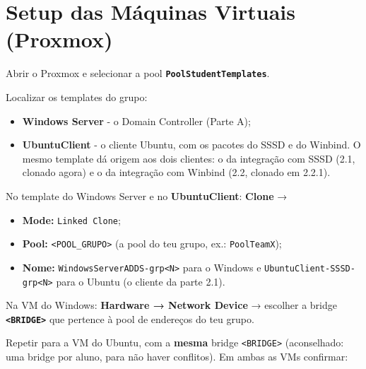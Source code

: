 
\section*{Setup das Máquinas Virtuais (Proxmox)}


Abrir o Proxmox e selecionar a pool \textbf{\texttt{PoolStudentTemplates}}.


Localizar os templates do grupo:

\begin{itemize}
\item \textbf{Windows Server} - o Domain Controller (Parte A);
\item \textbf{UbuntuClient} - o cliente Ubuntu, com os pacotes do SSSD e do Winbind. O mesmo template dá origem aos dois clientes: o da integração com SSSD (2.1, clonado agora) e o da integração com Winbind (2.2, clonado em 2.2.1).
\end{itemize}


No template do Windows Server e no \textbf{UbuntuClient}: \textbf{Clone} →

\begin{itemize}
\item \textbf{Mode:} \texttt{Linked Clone};
\item \textbf{Pool:} \texttt{\textless{}POOL\_GRUPO\textgreater{}} (a pool do teu grupo, ex.: \texttt{PoolTeamX});
\item \textbf{Nome:} \texttt{WindowsServerADDS-grp\textless{}N\textgreater{}} para o Windows e \texttt{UbuntuClient-SSSD-grp\textless{}N\textgreater{}} para o Ubuntu (o cliente da parte 2.1).
\end{itemize}


Na VM do Windows: \textbf{Hardware → Network Device} → escolher a bridge \textbf{\texttt{\textless{}BRIDGE\textgreater{}}} que pertence à pool de endereços do teu grupo.


Repetir para a VM do Ubuntu, com a \textbf{mesma} bridge \texttt{\textless{}BRIDGE\textgreater{}} (aconselhado: uma bridge por aluno, para não haver conflitos). Em ambas as VMs confirmar:

